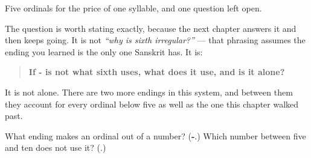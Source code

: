 \begin{grammarlens}[title={What you've built}]
Five ordinals for the price of one syllable, and one question left open.

The question is worth stating exactly, because the next chapter answers it and then keeps going. It is not \emph{\textquotedblleft{}why is sixth irregular?\textquotedblright{}} — that phrasing assumes the ending you learned is the only one Sanskrit has. It is:

\begin{quote}
\textbf{If - is not what sixth uses, what does it use, and is it alone?}
\end{quote}

It is not alone. There are two more endings in this system, and between them they account for every ordinal below five as well as the one this chapter walked past.
\end{grammarlens}

\begin{tcolorbox}[breakable,colback=teal!4,colframe=teal!35!black,title={Before you move on}]
What ending makes an ordinal out of a number? (\textbf{-}.) Which number between five and ten does not use it? (\emph{\textbf{}}.)
\end{tcolorbox}
